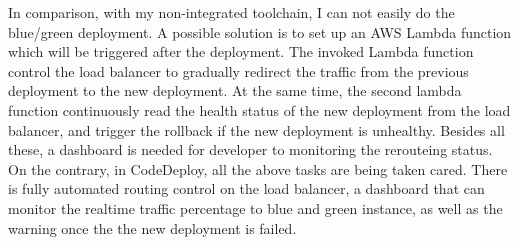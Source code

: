 \par
In comparison, with my non-integrated toolchain, I can not easily do the blue/green deployment. A possible solution is to set up an AWS Lambda function which will be triggered after the deployment. The invoked Lambda function control the load balancer to gradually redirect the traffic from the previous deployment to the new deployment. At the same time, the second lambda function continuously read the health status of the new deployment from the load balancer, and trigger the rollback if the new deployment is unhealthy. 
Besides all these, a dashboard is needed for developer to monitoring the rerouteing status. On the contrary, in CodeDeploy, all the above tasks are being taken cared. There is fully automated routing control on the load balancer, a dashboard that can monitor the realtime traffic percentage to blue and green instance, as well as the warning once the the new deployment is failed.

